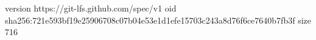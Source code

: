 version https://git-lfs.github.com/spec/v1
oid sha256:721e593bf19e25906708c07b04e53e1d1efe15703c243a8d76f6ce7640b7fb3f
size 716
